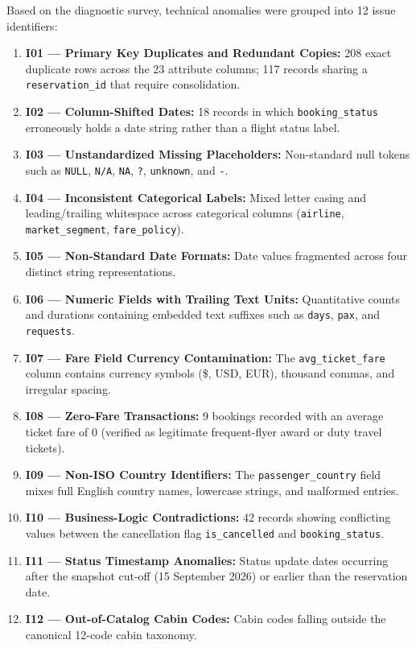 \documentclass[12pt, a4paper]{report}
\newcommand{\code}[1]{\texttt{\small\color{DarkSlate}#1}}
\begin{document}
Based on the diagnostic survey, technical anomalies were grouped into 12 issue identifiers:
\begin{enumerate}
  \item \textbf{I01 --- Primary Key Duplicates and Redundant Copies:} 208 exact duplicate rows across the 23 attribute columns; 117 records sharing a \code{reservation\_id} that require consolidation.
  \item \textbf{I02 --- Column-Shifted Dates:} 18 records in which \code{booking\_status} erroneously holds a date string rather than a flight status label.
  \item \textbf{I03 --- Unstandardized Missing Placeholders:} Non-standard null tokens such as \code{NULL}, \code{N/A}, \code{NA}, \code{?}, \code{unknown}, and \code{-}.
  \item \textbf{I04 --- Inconsistent Categorical Labels:} Mixed letter casing and leading/trailing whitespace across categorical columns (\code{airline}, \code{market\_segment}, \code{fare\_policy}).
  \item \textbf{I05 --- Non-Standard Date Formats:} Date values fragmented across four distinct string representations.
  \item \textbf{I06 --- Numeric Fields with Trailing Text Units:} Quantitative counts and durations containing embedded text suffixes such as \code{days}, \code{pax}, and \code{requests}.
  \item \textbf{I07 --- Fare Field Currency Contamination:} The \code{avg\_ticket\_fare} column contains currency symbols (\$, USD, EUR), thousand commas, and irregular spacing.
  \item \textbf{I08 --- Zero-Fare Transactions:} 9 bookings recorded with an average ticket fare of 0 (verified as legitimate frequent-flyer award or duty travel tickets).
  \item \textbf{I09 --- Non-ISO Country Identifiers:} The \code{passenger\_country} field mixes full English country names, lowercase strings, and malformed entries.
  \item \textbf{I10 --- Business-Logic Contradictions:} 42 records showing conflicting values between the cancellation flag \code{is\_cancelled} and \code{booking\_status}.
  \item \textbf{I11 --- Status Timestamp Anomalies:} Status update dates occurring after the snapshot cut-off (15 September 2026) or earlier than the reservation date.
  \item \textbf{I12 --- Out-of-Catalog Cabin Codes:} Cabin codes falling outside the canonical 12-code cabin taxonomy.
\end{enumerate}
\end{document}
